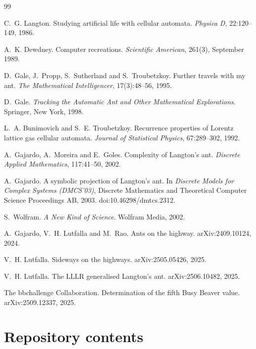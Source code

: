 \documentclass[11pt,a4paper]{article}
\theoremstyle{definition}
\theoremstyle{remark}
\begin{document}
\begin{thebibliography}{99}

C.~G. Langton.
\newblock Studying artificial life with cellular automata.
\newblock \emph{Physica D}, 22:120--149, 1986.

A.~K. Dewdney.
\newblock Computer recreations.
\newblock \emph{Scientific American}, 261(3), September 1989.

D.~Gale, J.~Propp, S.~Sutherland and S.~Troubetzkoy.
\newblock Further travels with my ant.
\newblock \emph{The Mathematical Intelligencer}, 17(3):48--56, 1995.

D.~Gale.
\newblock \emph{Tracking the Automatic Ant and Other Mathematical Explorations}.
\newblock Springer, New York, 1998.

L.~A. Bunimovich and S.~E. Troubetzkoy.
\newblock Recurrence properties of Lorentz lattice gas cellular automata.
\newblock \emph{Journal of Statistical Physics}, 67:289--302, 1992.

A.~Gajardo, A.~Moreira and E.~Goles.
\newblock Complexity of Langton's ant.
\newblock \emph{Discrete Applied Mathematics}, 117:41--50, 2002.

A.~Gajardo.
\newblock A symbolic projection of {L}angton's ant.
\newblock In \emph{Discrete Models for Complex Systems (DMCS'03)}, Discrete Mathematics and Theoretical
Computer Science Proceedings AB, 2003. doi:10.46298/dmtcs.2312.

S.~Wolfram.
\newblock \emph{A New Kind of Science}.
\newblock Wolfram Media, 2002.

A.~Gajardo, V.~H. Lutfalla and M.~Rao.
\newblock Ants on the highway.
\newblock arXiv:2409.10124, 2024.

V.~H. Lutfalla.
\newblock Sideways on the highways.
\newblock arXiv:2505.05426, 2025.

V.~H. Lutfalla.
\newblock The {LLLR} generalised {L}angton's ant.
\newblock arXiv:2506.10482, 2025.

The bbchallenge Collaboration.
\newblock Determination of the fifth Busy Beaver value.
\newblock arXiv:2509.12337, 2025.

\end{thebibliography}

\appendix
\section{Repository contents}\label{app:code}
\end{document}
